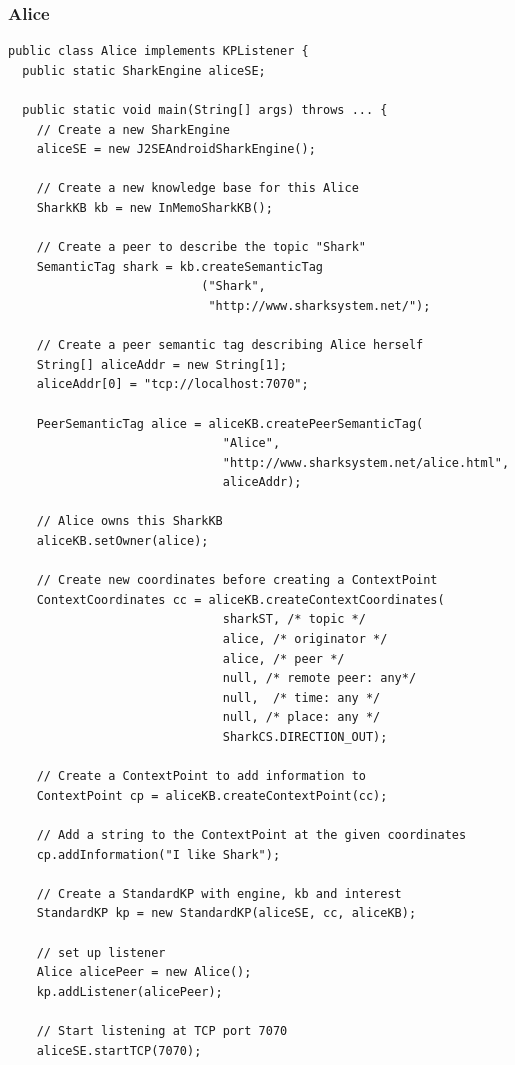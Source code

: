 \subsubsection{Alice}
\begin{verbatim}
public class Alice implements KPListener {
  public static SharkEngine aliceSE;

  public static void main(String[] args) throws ... {
    // Create a new SharkEngine
    aliceSE = new J2SEAndroidSharkEngine();

    // Create a new knowledge base for this Alice
    SharkKB kb = new InMemoSharkKB();

    // Create a peer to describe the topic "Shark"
    SemanticTag shark = kb.createSemanticTag
                           ("Shark",
                            "http://www.sharksystem.net/");
    
    // Create a peer semantic tag describing Alice herself
    String[] aliceAddr = new String[1];
    aliceAddr[0] = "tcp://localhost:7070";
 
    PeerSemanticTag alice = aliceKB.createPeerSemanticTag(
                              "Alice", 
                              "http://www.sharksystem.net/alice.html", 
                              aliceAddr);

    // Alice owns this SharkKB
    aliceKB.setOwner(alice);

    // Create new coordinates before creating a ContextPoint
    ContextCoordinates cc = aliceKB.createContextCoordinates(
                              sharkST, /* topic */
                              alice, /* originator */
                              alice, /* peer */ 
                              null, /* remote peer: any*/ 
                              null,  /* time: any */
                              null, /* place: any */
                              SharkCS.DIRECTION_OUT);

    // Create a ContextPoint to add information to
    ContextPoint cp = aliceKB.createContextPoint(cc);
 
    // Add a string to the ContextPoint at the given coordinates
    cp.addInformation("I like Shark");

    // Create a StandardKP with engine, kb and interest
    StandardKP kp = new StandardKP(aliceSE, cc, aliceKB);
 
    // set up listener
    Alice alicePeer = new Alice();
    kp.addListener(alicePeer);
 
    // Start listening at TCP port 7070
    aliceSE.startTCP(7070);


\end{verbatim}
